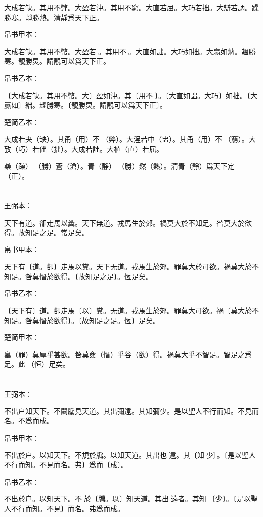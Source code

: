 \documentclass[a5paper]{ctexbook}
\begin{document}
    大成若缺。其用不弊。大盈若沖。其用不窮。大直若屈。大巧若拙。大辯若訥。躁勝寒。靜勝熱。清靜爲天下正。

    
    帛书甲本：

    大成若缺。其用不幣。大盈若𥁵。其用不𡩫。大直如詘。大巧如拙。大贏如㶧。趮勝寒。靚勝炅。請靚可以爲天下正。

    帛书乙本：

    〔大成若缺。其用不幣。大〕盈如沖。其〔用不𡩫〕。〔大直如詘。大巧〕如拙。〔大贏如〕絀。趮勝寒。〔靚勝炅。請靚可以爲天下正〕。

    楚简乙本：

    大成若夬（缺）。其甬（用）不󶵢（弊）。大浧若中（盅）。其甬（用）不󶵣（窮）。大攷（巧）若㑁（拙）。大成若詘。大植（直）若屈。

    喿（躁）󼡲（勝）蒼（滄）。青（静）󼡲（勝）然（熱）。清青（靜）爲天下定（正）。

    \chapter{}
    王弼本：

    天下有道。卻走馬以糞。天下無道。戎馬生於郊。禍莫大於不知足。咎莫大於欲得。故知足之足。常足矣。

    
    帛书甲本：

    天下有〔道。卻〕走馬以糞。天下无道。戎馬生於郊。罪莫大於可欲。禍莫大於不知足。咎莫憯於欲得。〔故知足之足〕。恆足矣。

    帛书乙本：

    〔天下有〕道。卻走馬〔以〕糞。无道。戎馬生於郊。罪莫大可欲。禍〔莫大於不知足。咎莫憯於欲得〕。〔故知足之足。恆〕足矣。

    楚简甲本：

    辠（罪）莫厚乎甚欲。咎莫僉（憯）乎谷（欲）得。禍莫大乎不智足。智足之爲足。此𠄨（恒）足矣。

    \chapter{}
    王弼本：

    不出户知天下。不闚牖見天道。其出彌遠。其知彌少。是以聖人不行而知。不見而名。不爲而成。

    
    帛书甲本：

    不出於户。以知天下。不規於牖。以知天道。其出也𢑃遠。其〔知󱁁少〕。〔是以聖人不行而知。不見而名。弗〕爲而〔成〕。

    帛书乙本：

    不出於户。以知天下。不𧠹於〔牖。以〕知天道。其出󱁁遠者。其知󱁁〔少〕。〔是以聖人不行而知。不見〕而名。弗爲而成。
\end{document}
